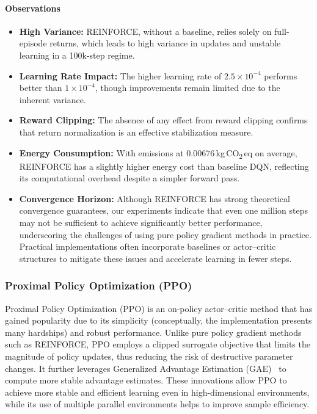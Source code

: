 \paragraph{Observations}
\begin{itemize}
	\item \textbf{High Variance:} REINFORCE, without a baseline, relies solely on full-episode returns, which leads to high variance in updates and unstable learning in a 100k-step regime.
	\item \textbf{Learning Rate Impact:} The higher learning rate of $2.5\times10^{-4}$ performs better than $1\times10^{-4}$, though improvements remain limited due to the inherent variance.
	\item \textbf{Reward Clipping:} The absence of any effect from reward clipping confirms that return normalization is an effective stabilization measure.
	\item \textbf{Energy Consumption:} With emissions at \num{0.00676}\,kg\,CO\textsubscript{2}\,eq on average, REINFORCE has a slightly higher energy cost than baseline DQN, reflecting its computational overhead despite a simpler forward pass.
	\item \textbf{Convergence Horizon:} Although REINFORCE has strong theoretical convergence guarantees, our experiments indicate that even one million steps may not be sufficient to achieve significantly better performance, underscoring the challenges of using pure policy gradient methods in practice. Practical implementations often incorporate baselines or actor–critic structures to mitigate these issues and accelerate learning in fewer steps.
\end{itemize}

\subsubsection{Proximal Policy Optimization (PPO)}
\label{subsubsec:ppo}
Proximal Policy Optimization (PPO) is an on-policy actor–critic method that has gained popularity due to its simplicity (conceptually, the implementation presents many hardships) and robust performance. Unlike pure policy gradient methods such as REINFORCE, PPO employs a clipped surrogate objective that limits the magnitude of policy updates, thus reducing the risk of destructive parameter changes. It further leverages Generalized Advantage Estimation (GAE)~\cite{schulman:gae} to compute more stable advantage estimates. These innovations allow PPO to achieve more stable and efficient learning even in high-dimensional environments, while its use of multiple parallel environments helps to improve sample efficiency.

